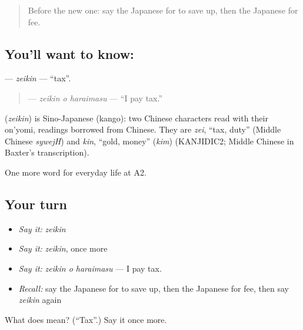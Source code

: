 \label{lesson:JA-C186-zeikin}



\begin{quote}
Before the new one: say the Japanese for to save up, then the Japanese for fee.
\end{quote}

\subsection*{You'll want to know: }
\textbf{} — \emph{zeikin} — \textquotedblleft{}tax\textquotedblright{}.

\begin{quote}
\textbf{ } — \emph{zeikin o haraimasu} — \textquotedblleft{}I pay tax.\textquotedblright{}
\end{quote}

\begin{cousinweb}
\textbf{} (\emph{zeikin}) is Sino-Japanese (kango): two Chinese characters read with their on'yomi, readings borrowed from Chinese. They are \emph{zei}, \textquotedblleft{}tax, duty\textquotedblright{} (Middle Chinese \emph{sywejH}) and \emph{kin}, \textquotedblleft{}gold, money\textquotedblright{} (\emph{kim}) (KANJIDIC2; Middle Chinese in Baxter's transcription).
\end{cousinweb}

\begin{grammarlens}[title={What you've built}]
One more word for everyday life at A2.
\end{grammarlens}

\subsection*{Your turn}
\begin{itemize}
\raggedright
  \item \emph{Say it:} \emph{zeikin}
  \item \emph{Say it:} \emph{zeikin}, once more
  \item \emph{Say it:} \emph{zeikin o haraimasu} — I pay tax.
  \item \emph{Recall:} say the Japanese for to save up, then the Japanese for fee, then say \emph{zeikin} again
\end{itemize}

\begin{tcolorbox}[breakable,colback=teal!4,colframe=teal!35!black,title={Before you move on}]
What does  mean? (\textquotedblleft{}Tax\textquotedblright{}.) Say it once more.
\end{tcolorbox}
